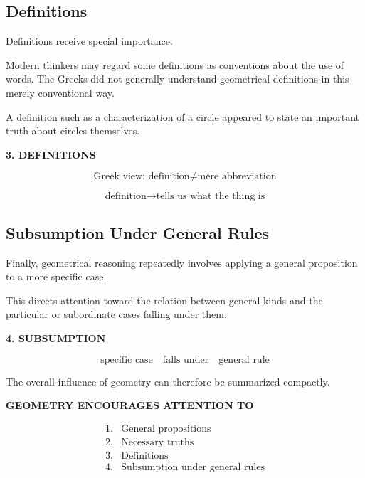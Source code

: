 \documentclass[11pt]{article}
\begin{document}
\subsection{Definitions}

Definitions receive special importance.

Modern thinkers may regard some definitions as conventions about
the use of words. The Greeks did not generally understand
geometrical definitions in this merely conventional way.

A definition such as a characterization of a circle appeared to
state an important truth about circles themselves.

\begin{whiteboard}
\textbf{3. DEFINITIONS}

\[
\text{Greek view: definition}
\neq
\text{mere abbreviation}
\]

\[
\text{definition}
\longrightarrow
\text{tells us what the thing is}
\]
\end{whiteboard}

\subsection{Subsumption Under General Rules}

Finally, geometrical reasoning repeatedly involves applying a
general proposition to a more specific case.

This directs attention toward the relation between general kinds
and the particular or subordinate cases falling under them.

\begin{whiteboard}
\textbf{4. SUBSUMPTION}

\[
\text{specific case}
\quad\text{falls under}\quad
\text{general rule}
\]
\end{whiteboard}

The overall influence of geometry can therefore be summarized
compactly.

\begin{whiteboard}
\textbf{GEOMETRY ENCOURAGES ATTENTION TO}

\[
\begin{array}{ll}
1. & \text{General propositions} \\[0.3em]
2. & \text{Necessary truths} \\[0.3em]
3. & \text{Definitions} \\[0.3em]
4. & \text{Subsumption under general rules}
\end{array}
\]
\end{whiteboard}
\end{document}
